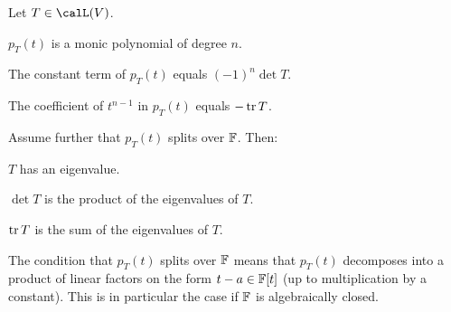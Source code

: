 \begin{proposition}
    \label{prop:determinant-eigenvalues}
    Let $T \in \lin(V)$.
    \begin{enumproposition}
        \item \label{enum:characteristic-polynomial-monic} $p_T(t)$ is a monic polynomial of degree $n$.
        \item \label{enum:characteristic-polynomial-constant-term} The constant term of $p_T(t)$ equals $(-1)^n \det T$.
        \item \label{enum:characteristic-polynomial-coefficient} The coefficient of $t^{n-1}$ in $p_T(t)$ equals $-\operatorname{tr} T$.
    \end{enumproposition}
    Assume further that $p_T(t)$ splits over $\mathbb{F}$. Then:
    \begin{enumproposition}[resume]
        \item \label{enum:eigenvalue-existence} $T$ has an eigenvalue.
        \item \label{enum:eigenvalue-product} $\det T$ is the product of the eigenvalues of $T$.
        \item \label{enum:eigenvalue-sum} $\operatorname{tr} T$ is the sum of the eigenvalues of $T$.
    \end{enumproposition}
\end{proposition}
%
The condition that $p_T(t)$ splits over $\mathbb{F}$ means that $p_T(t)$ decomposes into a product of linear factors on the form $t - a \in \mathbb{F}[t]$ (up to multiplication by a constant). This is in particular the case if $\mathbb{F}$ is algebraically closed.

